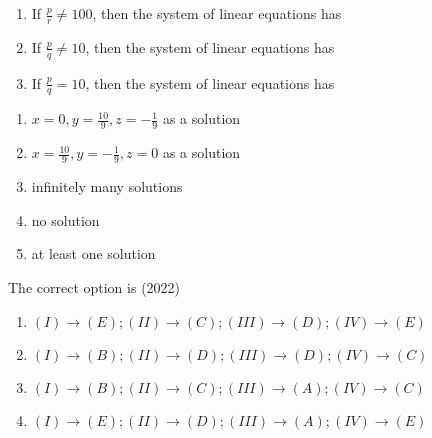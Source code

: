 \begin{enumerate}[label=\thesubsection.\arabic*.,ref=\thesubsection.\theenumi]
\begin{multicols}{2}
\begin{enumerate}[label=(\Roman*),itemsep=1ex]
		\item	 If \( \frac{p}{r} \neq 100 \), then the system of linear equations has 
		\item If \( \frac{p}{q} \neq 10 \), then the system of linear equations has 
		\item If \( \frac{p}{q} = 10 \), then the system of linear equations has 
\end{enumerate}
	\columnbreak
	\begin{enumerate}[label=(\Alph*)]
\item  \( x = 0,  y = \frac{10}{9}, z = -\frac{1}{9} \) as a solution  
\item  \( x = \frac{10}{9},  y = -\frac{1}{9},  z = 0 \) as a solution 
\item	  infinitely many solutions 
\item	   no solution 
\item	   at least one solution
\end{enumerate}
\end{multicols}
The correct option is
	\hfill (2022)
\begin{multicols}{4}
\begin{enumerate}		
	 \item $(I)\to(E);(II)\to(C);(III)\to(D);(IV)\to(E)$
	 \item $(I)\to(B);(II)\to(D);(III)\to(D);(IV)\to(C)$   
	 \item $(I)\to(B);(II)\to(C);(III)\to(A);(IV)\to(C)$
	 \item $(I)\to(E);(II)\to(D);(III)\to(A);(IV)\to(E)$
\end{enumerate}
\end{multicols}

\end{enumerate}
